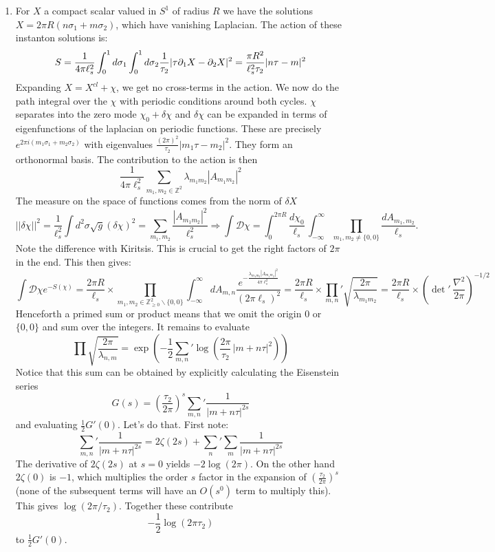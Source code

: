 \documentclass[11pt]{article}
\begin{document}
\begin{enumerate}
	\item For $X$ a compact scalar valued in $S^1$ of radius $R$ we have the solutions $X = 2\pi R (n \sigma_1 + m \sigma_2)$, which have vanishing Laplacian. The action of these instanton solutions is:
	\[
		S = \frac{1}{4 \pi \ell_s^2} \int_0^1 d\sigma_1 \int_0^1 d \sigma_2 \frac{1}{\tau_2} |\tau \partial_1 X - \partial_2 X|^2 = \frac{\pi R^2}{\ell_s^2 \tau_2}|n \tau - m|^2
	\]
	Expanding $X = X^{cl} + \chi$, we get no cross-terms in the action. We now do the path integral over the $\chi$ with periodic conditions around both cycles. $\chi$ separates into the zero mode $\chi_0 + \delta \chi$ and $\delta \chi$ can be expanded in terms of eigenfunctions of the laplacian on periodic functions. These are precisely $e^{2\pi i (m_1 \sigma_1 + m_2 \sigma_2)}$ with eigenvalues $\frac{(2\pi)^2}{\tau_2} |m_1 \tau - m_2|^2$. They form an orthonormal basis. The contribution to the action is then
	\[
		\frac{1}{4\pi \ell_s^2} \sum_{m_1,m_2 \in \mathbb Z^2} \lambda_{m_1 m_2} |A_{m_1 m_2}|^2
	\]
	The measure on the space of functions comes from the norm of $\delta X$
	\[
		||\delta \chi||^2 = \frac{1}{\ell_s^2} \int d^2 \sigma \sqrt{g} (\delta \chi)^2 = \sum_{m_1, m_2} \frac{|A_{m_1 m_2}|^2}{\ell_s^2}
		\Rightarrow \int \mathcal D \chi = \int_0^{2\pi R} \frac{d \chi_0}{\ell_s} \, \int_{-\infty}^\infty \prod_{m_1,m_2 \neq \{0,0\}} \frac{d A_{m_1, m_2}}{\ell_s}.
	\]
	Note the difference with Kiritsis. This is crucial to get the right factors of $2\pi$ in the end. This then gives:
	\[
		\int \mathcal D \chi e^{-S(\chi)} = \frac{2 \pi R}{\ell_s} \times \prod_{m_1, m_2 \in \mathbb Z^2_{\geq 0} \backslash \{0,0\}} \int_{-\infty}^\infty dA_{m,n} \frac{e^{-\frac{\lambda_{m_1 m_2} |A_{m_1 m_2}|^2}{4 \pi \ell_s^2}}}{(2\pi \ell_s)^2} 
		= \frac{2\pi R}{\ell_s} \times {\prod_{m,n}}' \sqrt{\frac{2\pi}{\lambda_{m_1 m_2}}} 
		= \frac{2\pi R}{\ell_s} \times ({\det}'\, \frac{\nabla^2}{2\pi})^{-1/2}
	\]
	Henceforth a primed sum or product means that we omit the origin $0$ or $\{0, 0\}$ and sum over the integers. It remains to evaluate 
	\[
		\prod \sqrt{\frac{2\pi}{\lambda_{n,m}}} = \exp\left(-\frac12 {\sum_{m, n}}' \log\left( \frac{2\pi}{\tau_2}\, |m + n \tau|^2 \right) \right)
	\]
	Notice that this sum can be obtained by explicitly calculating the Eisenstein series
	\[
		G(s) = \left( \frac{\tau_2}{2\pi} \right)^{s} {\sum_{m,n}}' \frac{1}{|m + n \tau|^{2s}}
	\]
	and evaluating $\frac12 G'(0)$. Let's do that. First note:
	\[
		{\sum_{m,n}}' \frac{1}{|m + n \tau|^{2s}} = 2 \zeta(2s) + {\sum_{n}}' \sum_m \frac{1}{|m+n\tau|^{2s}} 
	\]
	The derivative of $2 \zeta(2s)$ at $s=0$ yields $-2 \log(2\pi)$. On the other hand $2 \zeta(0)$ is $-1$, which multiplies the order $s$ factor  in the expansion of $\left(\frac{\tau_2}{2\pi}\right)^{s}$ (none of the subsequent terms will have an $O(s^0)$ term to multiply this). This gives $\log(2 \pi / \tau_2)$. Together these contribute
	\[
		-\frac12 \log(2 \pi \tau_2)
	\]
	to $\frac12 G'(0)$.
	

\end{enumerate}
\end{document}
